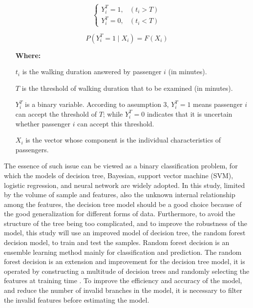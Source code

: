 \begin{equation}
    \left\{\begin{matrix}
		Y^T_i=1,&(t_i>T) \\
		Y^T_i=0,&(t_i<T)
	\end{matrix}\right.
	\label{eq:chp4:threshold}
\end{equation}

\begin{equation}
	P(Y^T_i=1 \mid X_i)=F(X_i)
	\label{eq:chp4:probability}
\end{equation}

%
\begin{enumerate}
	\setlength{\parskip}{0\baselineskip} %
	\normalsize
	\item[\textbf{Where:}]
	\item[$t_i$] is the walking duration answered by passenger $i$ (in minutes).
	\item[$T$] is the threshold of walking duration that to be examined (in minutes).
	\item[$Y^T_i$] is a binary variable. According to assumption 3, $Y^T_i=1$ means passenger $i$ can accept the threshold of $T$; while $Y^T_i=0$ indicates that it is uncertain whether passenger $i$ can accept this threshold.
	\item[$X_i$] is the vector whose component is the individual characteristics of passengers.
	\setlength{\parskip}{0.7\baselineskip} %
\end{enumerate}

%
The essence of such issue can be viewed as a binary classification problem, for which the models of decision tree, Bayesian, support vector machine (SVM), logistic regression, and neural network are widely adopted. In this study, limited by the volume of sample and features, also the unknown internal relationship among the features, the decision tree model should be a good choice because of the good generalization for different forms of data. Furthermore, to avoid the structure of the tree being too complicated, and to improve the robustness of the model, this study will use an improved model of decision tree, the random forest decision model, to train and test the samples. Random forest decision is an ensemble learning method mainly for classification and prediction. The random forest decision is an extension and improvement for the decision tree model, it is operated by constructing a multitude of decision trees and randomly selecting the features at training time \cite{ho1995random,ho1998random}. To improve the efficiency and accuracy of the model, and reduce the number of invalid branches in the model, it is necessary to filter the invalid features before estimating the model.

